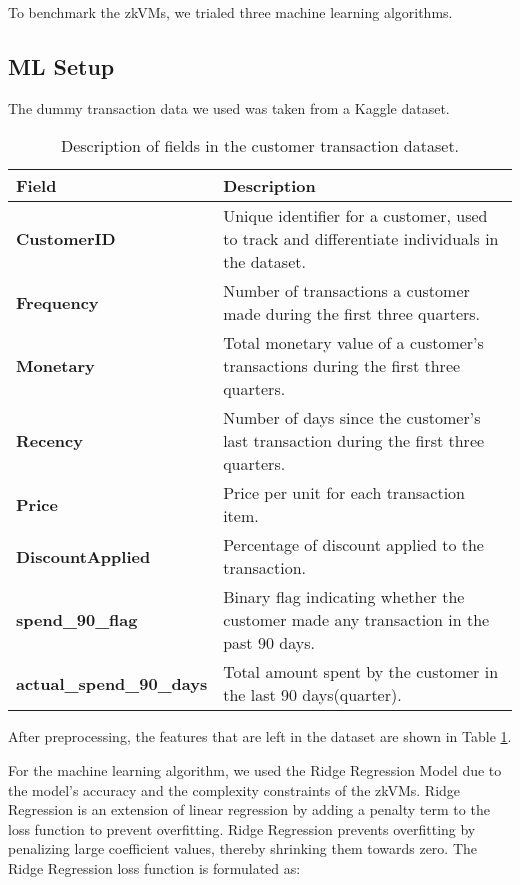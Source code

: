 \documentclass{scrartcl}
\begin{document}
To benchmark the zkVMs, we trialed three machine learning algorithms.

\subsection{ML Setup}

The dummy transaction data we used was taken from a Kaggle dataset\cite{rehman2023retail}. %

\begin{table}[ht!]
\centering
\begin{tabular}{|l|p{10cm}|}
\hline
\textbf{Field} & \textbf{Description} \\
\hline
\textbf{CustomerID} & Unique identifier for a customer, used to track and differentiate individuals in the dataset. \\
\hline
\textbf{Frequency} & Number of transactions a customer made during the first three quarters. \\
\hline
\textbf{Monetary} & Total monetary value of a customer's transactions during the first three quarters. \\
\hline
\textbf{Recency} & Number of days since the customer's last transaction during the first three quarters. \\
\hline
\textbf{Price} & Price per unit for each transaction item. \\
\hline
\textbf{DiscountApplied} & Percentage of discount applied to the transaction. \\
\hline
\textbf{spend\_90\_flag} & Binary flag indicating whether the customer made any transaction in the past 90 days. \\
\hline
\textbf{actual\_spend\_90\_days} & Total amount spent by the customer in the last 90 days(quarter). \\
\hline
\end{tabular}
\caption{Description of fields in the customer transaction dataset.}
\label{tab:dataset_description}
\end{table}

After preprocessing, the features that are left in the dataset are shown in Table \ref{tab:dataset_description}.

For the machine learning algorithm, we used the Ridge Regression Model due to the model's accuracy and the complexity constraints of the zkVMs. Ridge Regression is an extension of linear regression by adding a penalty term to the loss function to prevent overfitting.  Ridge Regression prevents overfitting by penalizing large coefficient values, thereby shrinking them towards zero. The Ridge Regression loss function is formulated as:
\end{document}
